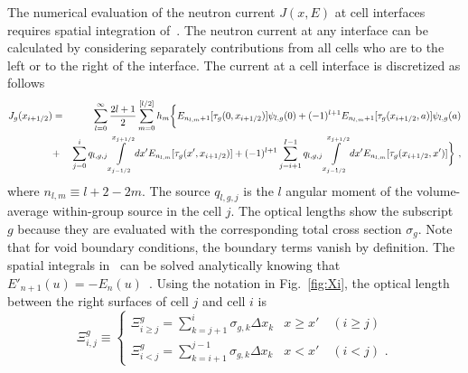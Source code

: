 The numerical evaluation of the neutron current $J(x,E)$ at cell interfaces requires spatial integration of~. The neutron current at any interface can be calculated by considering separately contributions from all cells who are to the left or to the right of the interface. The current at a cell interface is discretized as follows
\begin{eqnarray}\label{eq:tot-J-disc}
J_g(x_{i+1/2}) &=& \sum\limits_{l=0}^\infty  \frac{2l+1}{2}
\sum\limits_{m=0}^{[l/2]}  h_m
\bigg\{
E_{n_{l,m}+1}[\tau_g(0,x_{i+1/2})] \psi_{l,g}(0) 
+(-1)^{l+1} E_{n_{l,m}+1}[\tau_g(x_{i+1/2},a)]\psi_{l,g}(a)  \nonumber \\
&+&
\sum\limits_{j=0}^i q_{l,g,j}\int\limits_{x_{j-1/2}}^{x_{j+1/2}} dx'
E_{n_{l,m}}[\tau_g(x',x_{i+1/2})]
+(-1)^{l+1} 
\sum\limits_{j=i+1}^{I-1} q_{l,g,j}\int\limits_{x_{j-1/2}}^{x_{j+1/2}} dx'
E_{n_{l,m}}[\tau_g(x_{i+1/2},x')]
\bigg\}	\,\, , 
\end{eqnarray}
where $n_{l,m}\equiv l+2-2m$. The source $q_{l,g,j}$ is the $l$ angular moment of the volume-average within-group source in the cell $j$. The optical lengths show the subscript $g$ because they are evaluated with the corresponding total cross section $\sigma_g$. Note that for void boundary conditions, the boundary terms vanish by definition. The spatial integrals in~ can be solved analytically knowing that $E'_{n+1}(u)=-E_n(u)$~\cite{Gradshteyn-2007}. Using the notation in Fig.~\ref{fig:Xi}, the optical length between the right surfaces of cell $j$ and cell $i$ is
\begin{equation}\label{eq:psi_w_left_right}
\Xi^g_{i,j} \equiv \begin{cases}
\Xi^g_{i\geqslant j} = \sum\limits_{k=j+1}^i \sigma_{g,k}\Delta x_k 
& x\geqslant x' \quad (i\geqslant j) \\
\Xi^g_{i<j} = \sum\limits_{k=i+1}^{j-1} \sigma_{g,k}\Delta x_k & x<x' \quad (i<j)\,\, .
\end{cases} 
\end{equation} 

